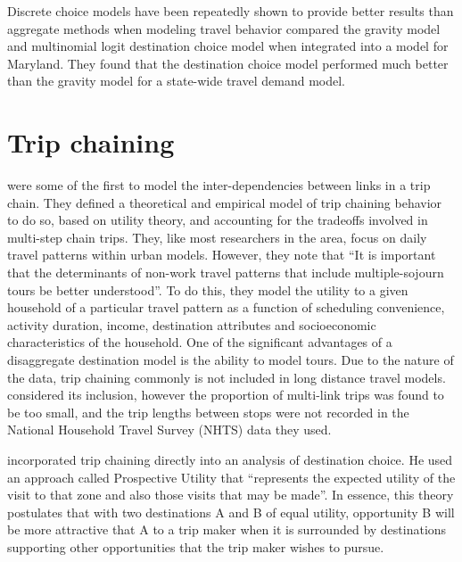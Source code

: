Discrete choice models have been repeatedly shown to provide better results than aggregate methods when modeling travel behavior \parencite{Stephanedes84, Mishra13} compared the gravity model and multinomial logit destination choice model when integrated into a model for Maryland. They found that the destination choice model performed much better than the gravity model for a state-wide travel demand model. 

\section{Trip chaining}
\textcite{AdlerAkiva79} were some of the first to model the inter-dependencies between links in a trip chain. They defined a theoretical and empirical model of trip chaining behavior to do so, based on utility theory, and accounting for the tradeoffs involved in multi-step chain trips. They, like most researchers in the area, focus on daily travel patterns within urban models. However, they note that \enquote{It is important that the determinants of non-work travel patterns that include multiple-sojourn tours be better understood}. To do this, they model the utility to a given household of a particular travel pattern as a function of scheduling convenience, activity duration, income, destination attributes and socioeconomic characteristics of the household.
One of the significant advantages of a disaggregate destination model is the ability to model tours. Due to the nature of the data, trip chaining commonly is not included in long distance travel models. \textcite{Moeckel15} considered its inclusion, however the proportion of multi-link trips was found to be too small, and the trip lengths between stops were not recorded in the National Household Travel Survey (NHTS) data they used. 

\textcite{Kitamura84} incorporated trip chaining directly into an analysis of destination choice. He used an approach called Prospective Utility that \enquote{represents the expected utility of the visit to that zone and also those visits that may be made}. In essence, this theory postulates that with two destinations A and B of equal utility, opportunity B will be more attractive that A to a trip maker when it is surrounded by destinations supporting other opportunities that the trip maker wishes to pursue.

